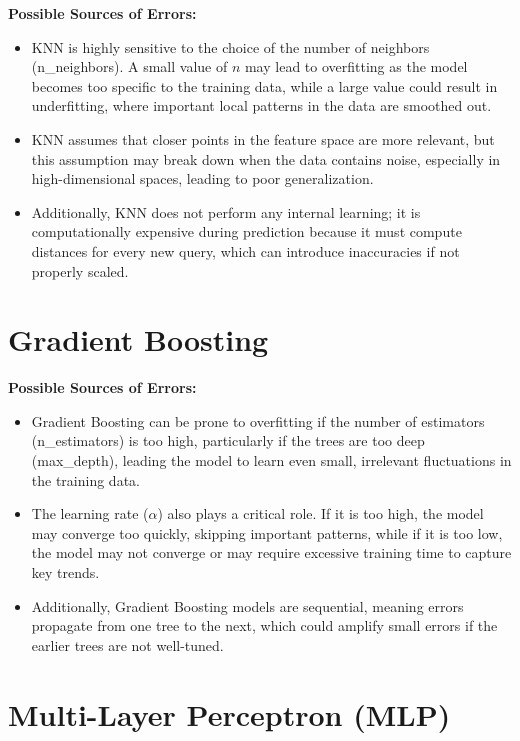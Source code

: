 \documentclass[12pt]{report}
\begin{document}
\textbf{Possible Sources of Errors:} 
\begin{itemize}
    \item KNN is highly sensitive to the choice of the number of neighbors (n\_neighbors). A small value of \(n\) may lead to overfitting as the model becomes too specific to the training data, while a large value could result in underfitting, where important local patterns in the data are smoothed out.
    \item KNN assumes that closer points in the feature space are more relevant, but this assumption may break down when the data contains noise, especially in high-dimensional spaces, leading to poor generalization.
    \item Additionally, KNN does not perform any internal learning; it is computationally expensive during prediction because it must compute distances for every new query, which can introduce inaccuracies if not properly scaled.
\end{itemize}

\section{Gradient Boosting}


\textbf{Possible Sources of Errors:} 
\begin{itemize}
    \item Gradient Boosting can be prone to overfitting if the number of estimators (n\_estimators) is too high, particularly if the trees are too deep (max\_depth), leading the model to learn even small, irrelevant fluctuations in the training data.
    \item The learning rate (\( \alpha \)) also plays a critical role. If it is too high, the model may converge too quickly, skipping important patterns, while if it is too low, the model may not converge or may require excessive training time to capture key trends.
    \item Additionally, Gradient Boosting models are sequential, meaning errors propagate from one tree to the next, which could amplify small errors if the earlier trees are not well-tuned.
\end{itemize}

\section{Multi-Layer Perceptron (MLP)}
\end{document}
